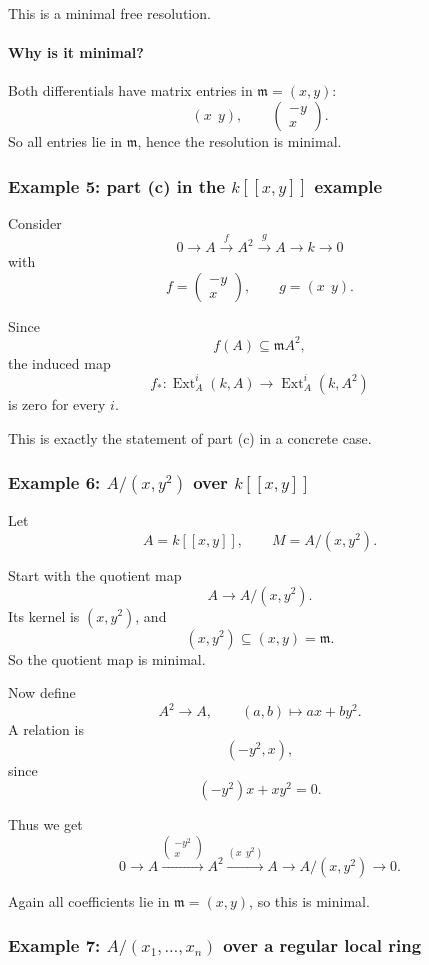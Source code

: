 \documentclass[12pt,a4paper]{article}
\theoremstyle{notespace}
\DeclareMathOperator{\Ext}{Ext}
\newcommand{\m}{\mathfrak m}
\begin{document}
This is a minimal free resolution.

\paragraph{Why is it minimal?}

Both differentials have matrix entries in \(\m=(x,y)\):
\[
(x\ \ y),\qquad \begin{pmatrix}-y\\x\end{pmatrix}.
\]
So all entries lie in \(\m\), hence the resolution is minimal.

\subsubsection{Example 5: part (c) in the \(k[[x,y]]\) example}

Consider
\[
0\to A \xrightarrow{f} A^2 \xrightarrow{g} A \to k \to 0
\]
with
\[
f=\begin{pmatrix}-y\\x\end{pmatrix},\qquad g=(x\ \ y).
\]

Since
\[
f(A)\subseteq \m A^2,
\]
the induced map
\[
f_*:\Ext_A^i(k,A)\to \Ext_A^i(k,A^2)
\]
is zero for every \(i\).

This is exactly the statement of part (c) in a concrete case.

\subsubsection{Example 6: \(A/(x,y^2)\) over \(k[[x,y]]\)}

Let
\[
A=k[[x,y]],\qquad M=A/(x,y^2).
\]

Start with the quotient map
\[
A\to A/(x,y^2).
\]
Its kernel is \((x,y^2)\), and
\[
(x,y^2)\subseteq (x,y)=\m.
\]
So the quotient map is minimal.

Now define
\[
A^2\to A,\qquad (a,b)\mapsto ax+by^2.
\]
A relation is
\[
(-y^2,x),
\]
since
\[
(-y^2)x + x y^2=0.
\]

Thus we get
\[
0\to A \xrightarrow{\begin{pmatrix}-y^2\\x\end{pmatrix}} A^2
\xrightarrow{(x\ \ y^2)} A \to A/(x,y^2)\to 0.
\]

Again all coefficients lie in \(\m=(x,y)\), so this is minimal.

\subsubsection{Example 7: \(A/(x_1,\dots,x_n)\) over a regular local ring}
\end{document}
